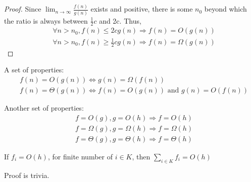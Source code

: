 					\begin{proof}
						Since $\lim_{n\rightarrow \infty} \frac{f(n)}{g(n)}$ exists and positive, there is some $n_0$ beyond which the ratio is always between $\frac12 c$ and 2c. Thus,
						\begin{align}
							& \forall n > n_0, f(n) \le 2cg(n) \Rightarrow f(n) = O(g(n)) \\
							& \forall n > n_0, f(n) \ge \frac12cg(n) \Rightarrow f(n) = \Omega(g(n))
						\end{align}
					\end{proof}

					A set of properties:
					\begin{align}
						& f(n) = O(g(n)) \iff g(n) = \Omega(f(n))\\
						& f(n) = \Theta(g(n)) \iff f(n) = O(g(n)) \text{ and } g(n) = O(f(n))
					\end{align}

					Another set of properties:
					\begin{align}
						& f = O(g), g = O(h) \Rightarrow f=O(h) \\
						& f = \Omega(g), g = \Omega(h) \Rightarrow f=\Omega(h) \\
						& f = \Theta(g), g = \Theta(h) \Rightarrow f=\Theta(h)
					\end{align}

					\begin{theorem}
						If $f_i = O(h)$, for finite number of $i \in K$, then $\sum_{i\in K} f_i = O(h)$
					\end{theorem}

					Proof is trivia.


